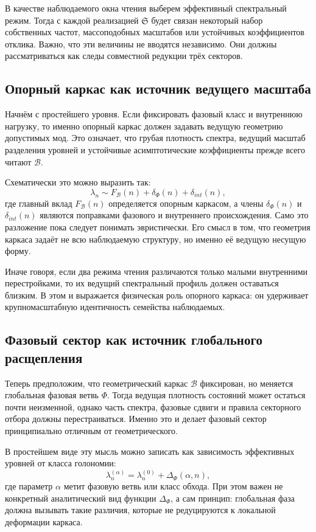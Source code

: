 \documentclass[12pt,a4paper]{article}
\begin{document}
В качестве наблюдаемого окна чтения выберем эффективный спектральный режим. Тогда с каждой реализацией \(\mathfrak{S}\) будет связан некоторый набор собственных частот, массоподобных масштабов или устойчивых коэффициентов отклика. Важно, что эти величины не вводятся независимо. Они должны рассматриваться как следы совместной редукции трёх секторов.

\subsection{Опорный каркас как источник ведущего масштаба}

Начнём с простейшего уровня. Если фиксировать фазовый класс и внутреннюю нагрузку, то именно опорный каркас должен задавать ведущую геометрию допустимых мод. Это означает, что грубая плотность спектра, ведущий масштаб разделения уровней и устойчивые асимптотические коэффициенты прежде всего читают \(\mathcal{B}\).

Схематически это можно выразить так:
\begin{equation}
\lambda_n \sim F_{\mathcal{B}}(n) + \delta_{\Phi}(n) + \delta_{int}(n),
\end{equation}
где главный вклад \(F_{\mathcal{B}}(n)\) определяется опорным каркасом, а члены \(\delta_{\Phi}(n)\) и \(\delta_{int}(n)\) являются поправками фазового и внутреннего происхождения. Само это разложение пока следует понимать эвристически. Его смысл в том, что геометрия каркаса задаёт не всю наблюдаемую структуру, но именно её ведущую несущую форму.

Иначе говоря, если два режима чтения различаются только малыми внутренними перестройками, то их ведущий спектральный профиль должен оставаться близким. В этом и выражается физическая роль опорного каркаса: он удерживает крупномасштабную идентичность семейства наблюдаемых.

\subsection{Фазовый сектор как источник глобального расщепления}

Теперь предположим, что геометрический каркас \(\mathcal{B}\) фиксирован, но меняется глобальная фазовая ветвь \(\Phi\). Тогда ведущая плотность состояний может остаться почти неизменной, однако часть спектра, фазовые сдвиги и правила секторного отбора должны перестраиваться. Именно это и делает фазовый сектор принципиально отличным от геометрического.

В простейшем виде эту мысль можно записать как зависимость эффективных уровней от класса голономии:
\begin{equation}
\lambda_n^{(\alpha)} = \lambda_n^{(0)} + \Delta_{\Phi}(\alpha,n),
\end{equation}
где параметр \(\alpha\) метит фазовую ветвь или класс обхода. При этом важен не конкретный аналитический вид функции \(\Delta_{\Phi}\), а сам принцип: глобальная фаза должна вызывать такие различия, которые не редуцируются к локальной деформации каркаса.
\end{document}
